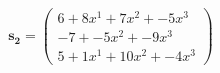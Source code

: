 \documentclass[preview]{standalone}
\begin{document}
\begin{align*}
\mathbf{s_2} = \begin{pmatrix}6 + 8x^{1} + 7x^{2} + -5x^{3} \\ -7 + -5x^{2} + -9x^{3} \\ 5 + 1x^{1} + 10x^{2} + -4x^{3}\end{pmatrix}
\end{align*}
\end{document}
